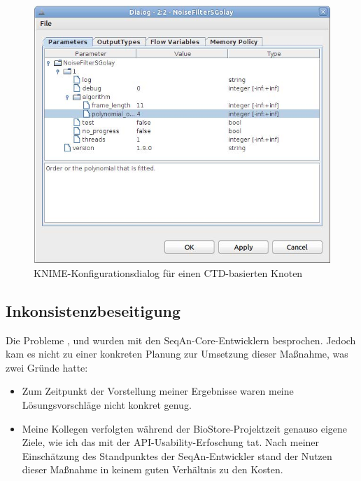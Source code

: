 \begin{figure}
  \centering
    \includegraphics[width=0.65\linewidth]{Figures/knime-config.jpg}
  \caption{KNIME-Konfigurationsdialog für einen CTD-basierten Knoten}
  \label{fig:knime-config}
\end{figure}

\subsection{Inkonsistenzbeseitigung}
\label{sec:Inkonsistenzbeseitigung}

Die Probleme ,  und  wurden mit den SeqAn-Core-Entwicklern besprochen. Jedoch kam es nicht zu einer konkreten Planung zur Umsetzung dieser Maßnahme, was zwei Gründe hatte:
\begin{itemize}
  \item Zum Zeitpunkt der Vorstellung meiner Ergebnisse waren meine Lösungsvorschläge nicht konkret genug.
  \item Meine Kollegen verfolgten während der BioStore-Projektzeit genauso eigene Ziele, wie ich das mit der API-Usability-Erfoschung tat. Nach meiner Einschätzung des Standpunktes der SeqAn-Entwickler stand der Nutzen dieser Maßnahme in keinem guten Verhältnis zu den Kosten.
\end{itemize}



